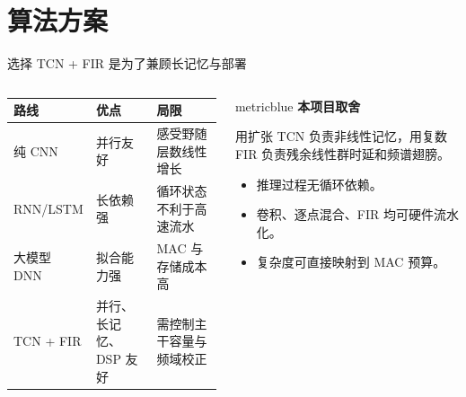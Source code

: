 \documentclass[20pt, cjk, slidetop, table]{beamer}
\begin{document}
\section{算法方案}
\begin{frame}{选择 TCN + FIR 是为了兼顾长记忆与部署}
  \begin{columns}[T,onlytextwidth]
    \begin{column}{0.54\linewidth}
      \begin{tabularx}{\linewidth}{l Y Y}
        \toprule
        路线 & 优点 & 局限 \\
        \midrule
        纯 CNN & 并行友好 & 感受野随层数线性增长 \\
        RNN/LSTM & 长依赖强 & 循环状态不利于高速流水 \\
        大模型 DNN & 拟合能力强 & MAC 与存储成本高 \\
        TCN + FIR & 并行、长记忆、DSP 友好 & 需控制主干容量与频域校正 \\
        \bottomrule
      \end{tabularx}
    \end{column}
    \begin{column}{0.4\linewidth}
      \begin{beamercolorbox}[wd=\linewidth,sep=0.85em]{metricblue}
        \textbf{本项目取舍}\par
        用扩张 TCN 负责非线性记忆，用复数 FIR 负责残余线性群时延和频谱翅膀。
      \end{beamercolorbox}

      \vspace{0.55cm}
      \begin{itemize}
        \item 推理过程无循环依赖。
        \item 卷积、逐点混合、FIR 均可硬件流水化。
        \item 复杂度可直接映射到 MAC 预算。
      \end{itemize}
    \end{column}
  \end{columns}
\end{frame}
\end{document}
